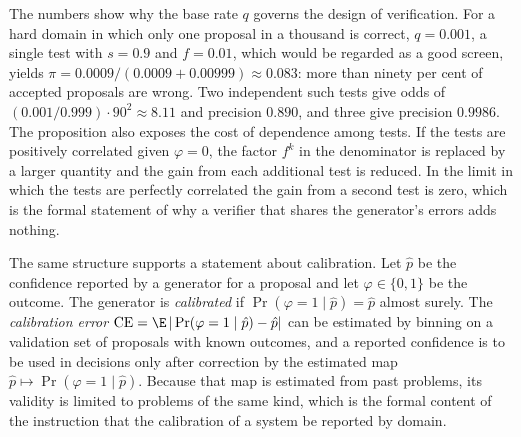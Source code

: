 The numbers show why the base rate $q$ governs the design of verification. For a hard domain in which only one proposal in a thousand is correct, $q=0.001$, a single test with $s=0.9$ and $f=0.01$, which would be regarded as a good screen, yields $\pi=0.0009/(0.0009+0.00999)\approx0.083$: more than ninety per cent of accepted proposals are wrong. Two independent such tests give odds of $(0.001/0.999)\cdot90^2\approx8.11$ and precision $0.890$, and three give precision $0.9986$. The proposition also exposes the cost of dependence among tests. If the tests are positively correlated given $\varphi=0$, the factor $f^k$ in the denominator is replaced by a larger quantity and the gain from each additional test is reduced. In the limit in which the tests are perfectly correlated the gain from a second test is zero, which is the formal statement of why a verifier that shares the generator's errors adds nothing.

The same structure supports a statement about calibration. Let $\hat p$ be the confidence reported by a generator for a proposal and let $\varphi\in\{0,1\}$ be the outcome. The generator is \emph{calibrated} if $\Pr(\varphi=1\mid\hat p)=\hat p$ almost surely. The \emph{calibration error} $\mathrm{CE}=\E\,|\Pr(\varphi=1\mid\hat p)-\hat p|$ can be estimated by binning on a validation set of proposals with known outcomes, and a reported confidence is to be used in decisions only after correction by the estimated map $\hat p\mapsto\Pr(\varphi=1\mid\hat p)$. Because that map is estimated from past problems, its validity is limited to problems of the same kind, which is the formal content of the instruction that the calibration of a system be reported by domain.
